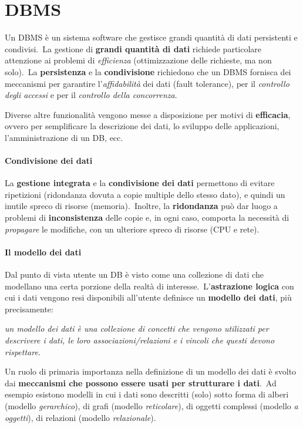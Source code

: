 \chapter{DBMS}

Un DBMS è un sistema software che gestisce grandi quantità di dati persistenti e condivisi.\
La gestione di \textbf{grandi quantità di dati} richiede particolare attenzione ai problemi di \textit{efficienza} (ottimizzazione delle richieste, ma non solo).\
La \textbf{persistenza} e la \textbf{condivisione} richiedono che un DBMS fornisca dei meccanismi per garantire l'\textit{affidabilità} dei dati (fault tolerance), per il \textit{controllo degli accessi} e per il \textit{controllo della concorrenza}.\

Diverse altre funzionalità vengono messe a disposizione per motivi di \textbf{efficacia}, ovvero per semplificare la descrizione dei dati, lo sviluppo delle applicazioni, l'amministrazione di un DB, ecc.\

\subsubsection{Condivisione dei dati}

La \textbf{gestione integrata} e la \textbf{condivisione dei dati} permettono di evitare ripetizioni (ridondanza dovuta a copie multiple dello stesso dato), e quindi un inutile spreco di risorse (memoria).\
Inoltre, la \textbf{ridondanza} può dar luogo a problemi di \textbf{inconsistenza} delle copie e, in ogni caso, comporta la necessità di \textit{propagare} le modifiche, con un ulteriore spreco di risorse (CPU e rete).\

\subsubsection{Il modello dei dati}

Dal punto di vista utente un DB è visto come una collezione di dati che modellano una certa porzione della realtà di interesse.\
L'\textbf{astrazione logica} con cui i dati vengono resi disponibili all'utente definisce un \textbf{modello dei dati}, più precisamente:

\vspace{12pt}
\noindent\textit{un modello dei dati è una collezione di concetti che vengono utilizzati per descrivere i dati, le loro associazioni/relazioni e i vincoli che questi devono rispettare}.\
\vspace{12pt}

\noindent Un ruolo di primaria importanza nella definizione di un modello dei dati è svolto dai \textbf{meccanismi che possono essere usati per strutturare i dati}.\
Ad esempio esistono modelli in cui i dati sono descritti (solo) sotto forma di alberi (modello \textit{gerarchico}), di grafi (modello \textit{reticolare}), di oggetti complessi (modello \textit{a oggetti}), di relazioni (modello \textit{relazionale}).

